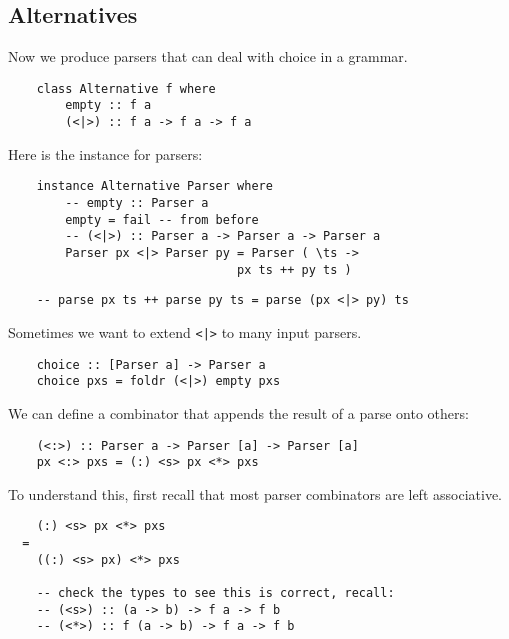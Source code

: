 \documentclass[a4paper,12pt]{article}
\theoremstyle{remark}
\begin{document}
\subsection{Alternatives}

Now we produce parsers that can deal with choice in a grammar.

\begin{lstlisting}
    class Alternative f where
        empty :: f a
        (<|>) :: f a -> f a -> f a  \end{lstlisting}

Here is the instance for parsers:

\begin{lstlisting}
    instance Alternative Parser where
        -- empty :: Parser a
        empty = fail -- from before
        -- (<|>) :: Parser a -> Parser a -> Parser a
        Parser px <|> Parser py = Parser ( \ts ->
                                px ts ++ py ts )  \end{lstlisting}

\begin{figure}[H]
  \centering
\end{figure}

\begin{lstlisting}
    -- parse px ts ++ parse py ts = parse (px <|> py) ts  \end{lstlisting}

Sometimes we want to extend \lstinline{<|>} to many input parsers.

\begin{lstlisting}
    choice :: [Parser a] -> Parser a
    choice pxs = foldr (<|>) empty pxs  \end{lstlisting}

We can define a combinator that appends the result of a parse onto others:

\begin{lstlisting}
    (<:>) :: Parser a -> Parser [a] -> Parser [a]
    px <:> pxs = (:) <s> px <*> pxs  \end{lstlisting}

To understand this, first recall that most parser combinators are left associative.

\begin{lstlisting}
    (:) <s> px <*> pxs
  =
    ((:) <s> px) <*> pxs

    -- check the types to see this is correct, recall:
    -- (<s>) :: (a -> b) -> f a -> f b
    -- (<*>) :: f (a -> b) -> f a -> f b  \end{lstlisting}
\end{document}
